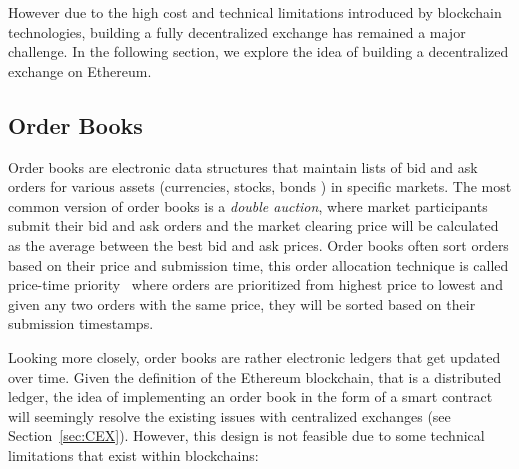 However due to the high cost and technical limitations introduced by blockchain technologies, building a fully decentralized exchange has remained a major challenge. In the following section, we explore the idea of building a decentralized exchange on Ethereum.



\subsection{Order Books}

Order books are electronic data structures that maintain lists of bid and ask orders for various assets (\eg currencies, stocks, bonds \etc) in specific markets. The most common version of order books is a \textit{double auction}, where market participants submit their bid and ask orders and the market clearing price will be calculated as the average between the best bid and ask prices. Order books often sort orders based on their price and submission time, this order allocation technique is called price-time priority~\cite{preis2011price} where orders are prioritized from highest price to lowest and given any two orders with the same price, they will be sorted based on their submission timestamps.

Looking more closely, order books are rather electronic ledgers that get updated over time. Given the definition of the Ethereum blockchain, that is a distributed ledger, the idea of implementing an order book in the form of a smart contract will seemingly resolve the existing issues with centralized exchanges (see Section~\ref{sec:CEX}). However, this design is not feasible due to some technical limitations that exist within blockchains:

